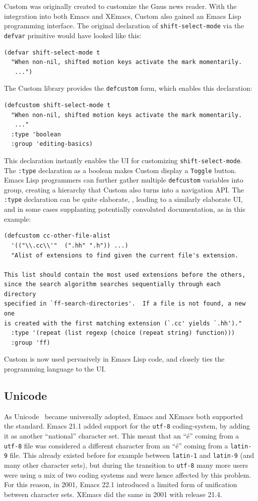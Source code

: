 \documentclass[format=acmsmall, review]{acmart}
\newcommand \Elisp {Emacs Lisp}
\begin{document}
Custom was originally created to customize the Gnus news reader.  With
the integration into both Emacs and XEmacs, Custom also gained an
\Elisp{} programming interface.  The original declaration of
\texttt{shift-select-mode} via the \texttt{defvar} primitive would
have looked like this:
%
\begin{verbatim}
(defvar shift-select-mode t
  "When non-nil, shifted motion keys activate the mark momentarily.
   ...")
\end{verbatim}
%
The Custom library provides the \texttt{defcustom} form, which enables
this declaration:
%
\begin{verbatim}
(defcustom shift-select-mode t
  "When non-nil, shifted motion keys activate the mark momentarily.
   ..."
  :type 'boolean
  :group 'editing-basics)
\end{verbatim}
%
This declaration instantly enables the UI for customizing
\texttt{shift-select-mode}.  The \texttt{:type} declaration as a
boolean makes Custom display a \texttt{Toggle} button.  \Elisp{}
programmers can further gather multiple \texttt{defcustom} variables
into group, creating a hierarchy that Custom also turns into a
navigation API.  The \texttt{:type} declaration can be quite
elaborate, , leading to a similarly elaborate UI, and in some cases
supplanting potentially convoluted documentation, as in this example:
%
\begin{verbatim}
(defcustom cc-other-file-alist
  '(("\\.cc\\'"  (".hh" ".h")) ...)
  "Alist of extensions to find given the current file's extension.

This list should contain the most used extensions before the others,
since the search algorithm searches sequentially through each directory
specified in `ff-search-directories'.  If a file is not found, a new one
is created with the first matching extension (`.cc' yields `.hh')."
  :type '(repeat (list regexp (choice (repeat string) function)))
  :group 'ff)
\end{verbatim}
%
Custom is now used pervasively in \Elisp{} code, and closely ties the
programming language to the UI.

\subsection{Unicode}
\label{sec:unicode}

As Unicode~\cite{Unicode6} became universally adopted, Emacs and XEmacs both
supported the standard.  Emacs 21.1 added support for the \texttt{utf-8}
coding-system, by adding it as another ``national'' character set.
This meant that an ``é'' coming from a \texttt{utf-8} file was considered a different
character from an ``é'' coming from a \texttt{latin-9} file.  This already
existed before for example between \texttt{latin-1} and \texttt{latin-9} (and many other
character sets), but during the transition to \texttt{utf-8} many more users were
using a mix of two coding systems and were hence affected by this problem.
For this reason, in 2001, Emacs 22.1 introduced a limited form of
unification between character sets.  XEmacs did the same in 2001 with
release 21.4.
\end{document}
